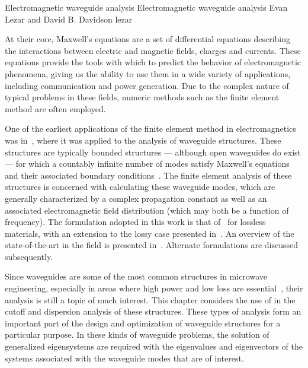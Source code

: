 \bgroup

\setcounter{chapter}{33}
\setcounter{chpnum}{33}

              {Electromagnetic waveguide analysis}
              {Electromagnetic waveguide analysis}
              {Evan Lezar and David B. Davidson}
              {lezar}


At their core, Maxwell's equations are a
set of differential equations describing the interactions between
electric and magnetic fields, charges and currents. These equations
provide the tools with which to predict the behavior of
electromagnetic phenomena, giving us the
ability to use them in a wide variety of applications, including
communication and power generation. Due to the complex nature of
typical problems in these fields, numeric methods such as the finite
element method are often employed.

One of the earliest applications of the finite element method in
electromagnetics was in~\citet{Silvester1969}, where it was applied to
the analysis of waveguide structures. These
structures are typically bounded structures --- although open
waveguides do exist --- for which a countably infinite \nobreak number of modes
satisfy Maxwell's equations and their associated boundary
conditions~\citep{Pozar2005}. The finite element analysis of these
structures is concerned with calculating these waveguide modes, which
are generally characterized by a complex propagation constant as well
as an associated electromagnetic field distribution (which may both be
a function of frequency). The formulation adopted in this work is that
of~\citet{LeeSunCendes1991} for lossless materials, with an extension
to the lossy case presented in~\citet{Lee1994}. An overview of the
state-of-the-art in the field is presented
in~\citet{Davidson2011}. Alternate formulations are discussed
subsequently.

Since waveguides are some of the most common structures in microwave
engineering, especially in areas where high power and low loss are
essential~\citep{Pozar2005}, their analysis is still a topic of much
interest. This chapter considers the use of \fenics{} in the cutoff
and dispersion analysis of these structures. These types of analysis form an important part
of the design and optimization of waveguide structures for a particular
purpose. In these kinds of waveguide problems, the solution of generalized
eigensystems are required with the eigenvalues and eigenvectors of the
systems associated with the waveguide modes that are of interest.

